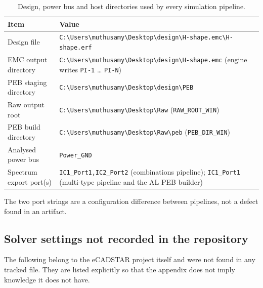 \begin{table}[htbp]
\centering
\caption{Design, power bus and host directories used by every simulation pipeline.}
\label{tab:appA_paths}
\begin{tabular}{p{} p{}}
\hline
Item & Value \\
\hline
Design file &
\texttt{C:\textbackslash{}Users\textbackslash{}muthusamy\textbackslash{}Desktop\textbackslash{}design\textbackslash{}H-shape.emc\textbackslash{}H-shape.erf} \\
EMC output directory &
\texttt{C:\textbackslash{}Users\textbackslash{}muthusamy\textbackslash{}Desktop\textbackslash{}design\textbackslash{}H-shape.emc}
(engine writes \texttt{PI-1} \ldots{} \texttt{PI-N}) \\
PEB staging directory &
\texttt{C:\textbackslash{}Users\textbackslash{}muthusamy\textbackslash{}Desktop\textbackslash{}design\textbackslash{}PEB} \\
Raw output root &
\texttt{C:\textbackslash{}Users\textbackslash{}muthusamy\textbackslash{}Desktop\textbackslash{}Raw}
(\texttt{RAW\_ROOT\_WIN}) \\
PEB build directory &
\texttt{C:\textbackslash{}Users\textbackslash{}muthusamy\textbackslash{}Desktop\textbackslash{}Raw\textbackslash{}peb}
(\texttt{PEB\_DIR\_WIN}) \\
Analysed power bus & \texttt{Power\_GND} \\
Spectrum export port(s) & \texttt{IC1\_Port1,IC2\_Port2} (combinations pipeline);
\texttt{IC1\_Port1} (multi-type pipeline and the AL PEB builder) \\
\hline
\end{tabular}
\end{table}

The two port strings are a configuration difference between pipelines, not a defect found in an
artifact. 

\subsection{Solver settings not recorded in the repository}
\label{subsec:appA_solver_gaps}

The following belong to the eCADSTAR project itself and were not found in any tracked file. They
are listed explicitly so that the appendix does not imply knowledge it does not have.

